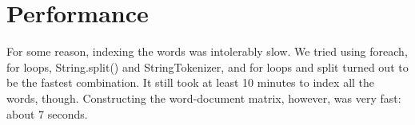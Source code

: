 \documentclass[11pt]{article}
\begin{document}
\section{Performance}
For some reason, indexing the words was intolerably slow.  We tried using foreach, for loops, String.split() and StringTokenizer, and for loops and split turned out to be the fastest combination.  It still took at least 10 minutes to index all the words, though.  Constructing the word-document matrix, however, was very fast: about 7 seconds.
\end{document}
